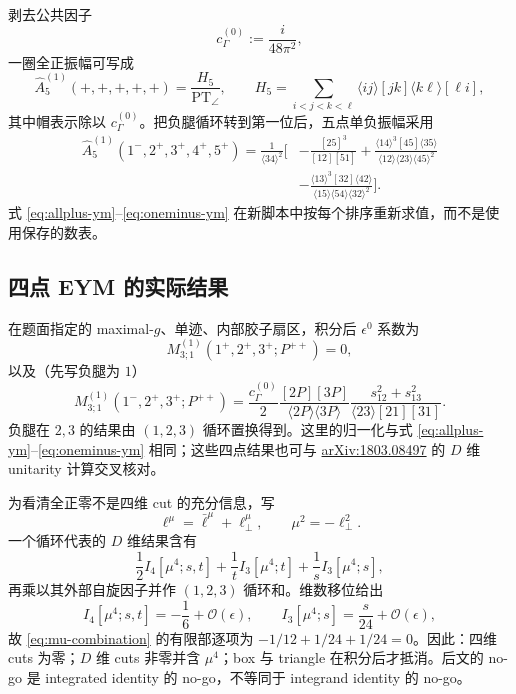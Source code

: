 \documentclass[11pt,a4paper,UTF8]{ctexart}
\newcommand{\cO}{\mathcal O}
\newcommand{\PT}{\operatorname{PT}}
\begin{document}
剥去公共因子
\begin{equation}
c_\Gamma^{(0)}:=\frac{i}{48\pi^2},
\end{equation}
一圈全正振幅可写成
\begin{equation}
\widehat A_{5}^{(1)}(+,+,+,+,+)
=\frac{H_5}{\PT_\angle},\qquad
H_5=\sum_{i<j<k<\ell}
\langle ij\rangle[jk]\langle k\ell\rangle[\ell i],
\label{eq:allplus-ym}
\end{equation}
其中帽表示除以 $c_\Gamma^{(0)}$。把负腿循环转到第一位后，五点单负振幅采用
\begin{align}
\widehat A_5^{(1)}(1^-,2^+,3^+,4^+,5^+)
=\frac{1}{\langle34\rangle^2}\bigg[
&-\frac{[25]^3}{[12][51]}
+\frac{\langle14\rangle^3[45]\langle35\rangle}
{\langle12\rangle\langle23\rangle\langle45\rangle^2}\nonumber\\
&-\frac{\langle13\rangle^3[32]\langle42\rangle}
{\langle15\rangle\langle54\rangle\langle32\rangle^2}
\bigg].
\label{eq:oneminus-ym}
\end{align}
式 \eqref{eq:allplus-ym}--\eqref{eq:oneminus-ym} 在新脚本中按每个排序重新求值，而不是使用保存的数表。

\subsection{四点 EYM 的实际结果}

在题面指定的 maximal-$g$、单迹、内部胶子扇区，积分后 $\epsilon^0$ 系数为
\begin{equation}
M_{3;1}^{(1)}(1^+,2^+,3^+;P^{++})=0,
\label{eq:eym-allplus}
\end{equation}
以及（先写负腿为 $1$）
\begin{equation}
M_{3;1}^{(1)}(1^-,2^+,3^+;P^{++})
=\frac{c_\Gamma^{(0)}}{2}
\frac{[2P][3P]}{\langle2P\rangle\langle3P\rangle}
\frac{s_{12}^2+s_{13}^2}{\langle23\rangle[21][31]}.
\label{eq:eym-oneminus}
\end{equation}
负腿在 $2,3$ 的结果由 $(1,2,3)$ 循环置换得到。这里的归一化与式 \eqref{eq:allplus-ym}--\eqref{eq:oneminus-ym} 相同；这些四点结果也可与
\href{https://arxiv.org/abs/1803.08497}{arXiv:1803.08497}
的 $D$ 维 unitarity 计算交叉核对。

为看清全正零不是四维 cut 的充分信息，写
\begin{equation}
\ell^\mu=\bar\ell^\mu+\ell_\perp^\mu,
\qquad \mu^2=-\ell_\perp^2.
\end{equation}
一个循环代表的 $D$ 维结果含有
\begin{equation}
\frac12 I_4[\mu^4;s,t]
+\frac1t I_3[\mu^4;t]
+\frac1s I_3[\mu^4;s],
\label{eq:mu-combination}
\end{equation}
再乘以其外部自旋因子并作 $(1,2,3)$ 循环和。维数移位给出
\begin{equation}
I_4[\mu^4;s,t]=-\frac16+\cO(\epsilon),
\qquad
I_3[\mu^4;s]=\frac{s}{24}+\cO(\epsilon),
\end{equation}
故 \eqref{eq:mu-combination} 的有限部逐项为
$-1/12+1/24+1/24=0$。因此：四维 cuts 为零；$D$ 维 cuts 非零并含 $\mu^4$；box 与 triangle 在积分后才抵消。后文的 no-go 是 integrated identity 的 no-go，不等同于 integrand identity 的 no-go。
\end{document}
